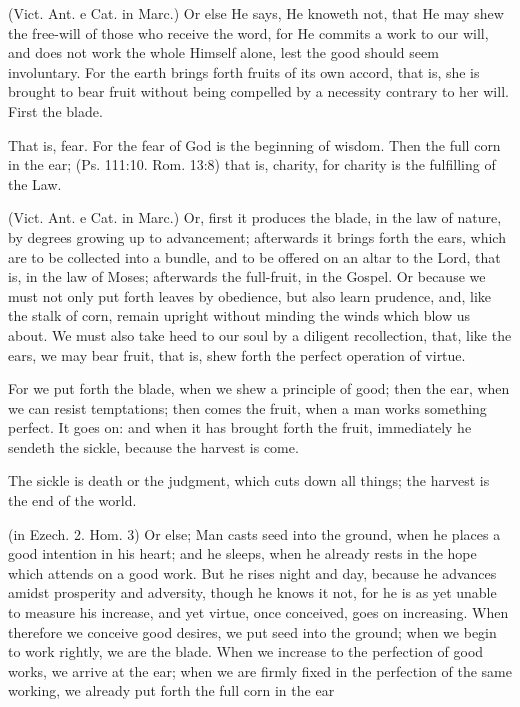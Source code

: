  (Vict. Ant. e Cat. in Marc.) Or else He says, He knoweth not, that He may shew the free-will of those who receive the word, for He commits a work to our will, and does not work the whole Himself alone, lest the good should seem involuntary. For the earth brings forth fruits of its own accord, that is, she is brought to bear fruit without being compelled by a necessity contrary to her will. First the blade.

 That is, fear. For the fear of God is the beginning of wisdom. Then the full corn in the ear; (Ps. 111:10. Rom. 13:8) that is, charity, for charity is the fulfilling of the Law.

 (Vict. Ant. e Cat. in Marc.) Or, first it produces the blade, in the law of nature, by degrees growing up to advancement; afterwards it brings forth the ears, which are to be collected into a bundle, and to be offered on an altar to the Lord, that is, in the law of Moses; afterwards the full-fruit, in the Gospel. Or because we must not only put forth leaves by obedience, but also learn prudence, and, like the stalk of corn, remain upright without minding the winds which blow us about. We must also take heed to our soul by a diligent recollection, that, like the ears, we may bear fruit, that is, shew forth the perfect operation of virtue.

 For we put forth the blade, when we shew a principle of good; then the ear, when we can resist temptations; then comes the fruit, when a man works something perfect. It goes on: and when it has brought forth the fruit, immediately he sendeth the sickle, because the harvest is come.

 The sickle is death or the judgment, which cuts down all things; the harvest is the end of the world.

 (in Ezech. 2. Hom. 3) Or else; Man casts seed into the ground, when he places a good intention in his heart; and he sleeps, when he already rests in the hope which attends on a good work. But he rises night and day, because he advances amidst prosperity and adversity, though he knows it not, for he is as yet unable to measure his increase, and yet virtue, once conceived, goes on increasing. When therefore we conceive good desires, we put seed into the ground; when we begin to work rightly, we are the blade. When we increase to the perfection of good works, we arrive at the ear; when we are firmly fixed in the perfection of the same working, we already put forth the full corn in the ear

